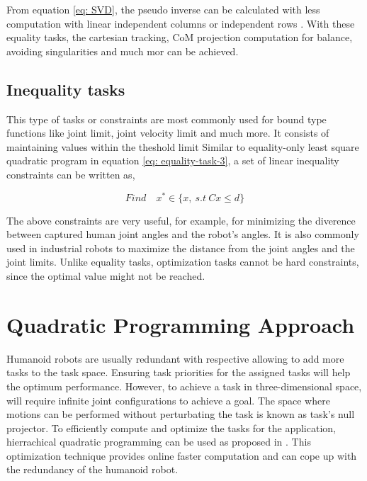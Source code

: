 From equation \ref{eq: SVD}, the pseudo inverse can be calculated with less computation with linear independent columns or independent rows \cite{louisepouble}. 
With these equality tasks, the cartesian tracking, CoM projection computation for balance, avoiding singularities and much mor can be achieved.

\subsection{Inequality tasks}

This type of tasks or constraints are most commonly used for bound type functions like joint limit, joint velocity limit and much more. It consists of maintaining values 
within the theshold limit Similar to equality-only least square quadratic program in equation \ref{eq: equality-task-3}, a set of linear inequality constraints can be 
written as,

\begin{equation}
    \label{eq: inequal-task-1}
    \mathit{Find} \quad x^* \in \{ x, \ \mathit{s.t} \  Cx \le d\}
\end{equation}

The above constraints are very useful, for example, for minimizing the diverence between captured human joint angles and the robot’s angles. It is also commonly used in industrial robots to maximize the distance from the joint angles and the joint limits. Unlike equality tasks, optimization tasks cannot be hard constraints, since the optimal value might not be reached.

\section{Quadratic Programming Approach}

Humanoid robots are usually redundant with respective allowing to add more tasks to the task space. Ensuring task priorities for the assigned tasks 
will help the optimum performance. However, to achieve a task in three-dimensional space, will require infinite joint configurations to achieve a goal.
The space where motions can be performed without perturbating the task is known as task's null projector.
To efficiently compute and optimize the tasks for the application, hierrachical quadratic programming can be used as proposed in \cite{escande2013planning}. This
optimization technique provides  online faster computation and can cope up with the redundancy of the humanoid robot.


